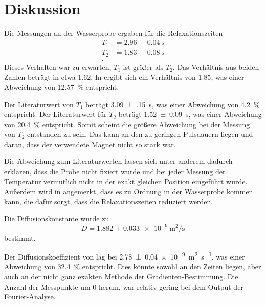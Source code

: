 \section{Diskussion}

Die Messungen an der Wasserprobe ergaben für die Relaxationszeiten
\begin{align*}
    T_1 &= \SI{2.96(4)}{\second} \\
    T_2 &= \SI{1.83(8)}{\second} \\.
\end{align*}
Dieses Verhalten war zu erwarten, $T_1$ ist größer als $T_2$. 
Das Verhältnis aus beiden Zahlen beträgt in etwa $\num{1.62}$. 
In \cite{chang} ergibt sich ein Verhältnis von $\num{1.85}$, was einer Abweichung von \SI{12.57}{\percent} entspricht. 

Der Literaturwert von $T_1$ beträgt \SI{3.09(15)}{\second}, was einer Abweichung von \SI{4.2}{\percent} entspricht.
Der Literaturwert für $T_2$ beträgt \SI{1.52(9)}{\second}, was einer Abweichung von \SI{20.4}{\percent} entspricht. Somit scheint die größere Abweichung bei der Messung von $T_2$ entstanden zu sein. Das kann an den zu geringen Pulsdauern liegen und daran, dass der verwendete Magnet nicht so stark war.

Die Abweichung zum Literaturwerten lassen sich unter anderem dadurch erklären, dass die Probe nicht fixiert wurde und bei jeder Messung der Temperatur vermutlich nicht in der exakt gleichen Position eingeführt wurde. Außerdem wird in \cite{chang} angemerkt, dass es zu Ordnung in der Wasserprobe kommen kann, die dafür sorgt, dass die Relaxationszeiten reduziert werden. 

Die Diffusionskonstante wurde zu 
\begin{equation*}
    D = \SI{1.882(33)e-9}{\meter\squared\per\second}
    \end{equation*}
bestimmt. 

Der Diffusionskoeffizient von \cite{chang} lag bei \SI{2.78(4)e-9}{\meter\squared\per\second}, was einer Abweichung von \SI{32.4}{\percent} entspricht. Dies könnte sowohl an den Zeiten liegen, aber auch an der nicht ganz exakten Methode der Gradienten-Bestimmung. Die Anzahl der Messpunkte um \num{0} herum, war relativ gering bei dem Output der Fourier-Analyse. 




